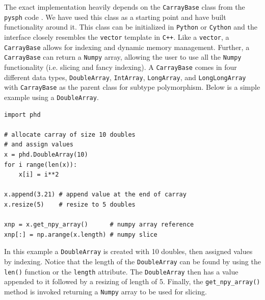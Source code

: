 The exact implementation heavily depends on the \lstinline{CarrayBase} class from the \texttt{pysph} code 
\citep{Ramachandran2016}. We have used this class as a starting point and have built functionality around
it. This class can be initialized in \texttt{Python} or \texttt{Cython} and the
interface closely resembles the \texttt{vector} template in \texttt{C++}. Like a \texttt{vector},
a \lstinline{CarrayBase} allows for indexing and dynamic memory management. 
Further, a \lstinline{CarrayBase} can return a \texttt{Numpy} array, allowing the user to use all 
the \texttt{Numpy} functionality (i.e. slicing and fancy indexing). A \lstinline{CarrayBase} comes 
in four different data types, \lstinline{DoubleArray}, \lstinline{IntArray}, \lstinline{LongArray},
and \lstinline{LongLongArray} with \lstinline{CarrayBase} as the parent class for subtype polymorphism.
Below is a simple example using a \lstinline{DoubleArray}.
\begin{lstlisting}
import phd

# allocate carray of size 10 doubles
# and assign values
x = phd.DoubleArray(10)
for i range(len(x)):
	x[i] = i**2

x.append(3.21) # append value at the end of carray
x.resize(5)    # resize to 5 doubles

xnp = x.get_npy_array()      # numpy array reference
xnp[:] = np.arange(x.length) # numpy slice
\end{lstlisting}
In this example a \lstinline{DoubleArray} is created with 10 doubles, then assigned values by indexing. 
Notice that the length of the \lstinline{DoubleArray} can be found by using the \lstinline{len()}
function or the \lstinline{length} attribute. The \lstinline{DoubleArray} then has a value appended to
it followed by a resizing of length of 5. Finally, the \lstinline{get_npy_array()} method is invoked 
returning a \texttt{Numpy} array to be used for slicing. 

